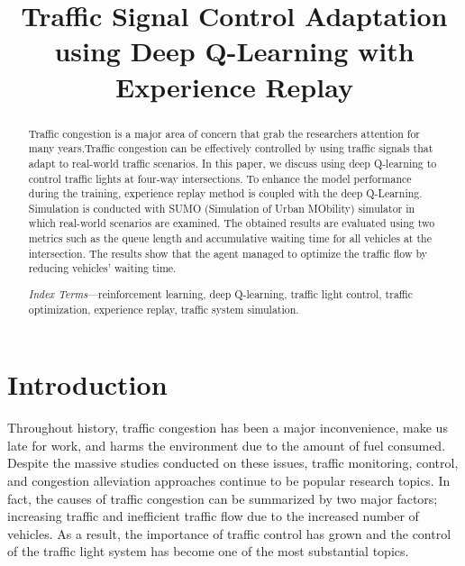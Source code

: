 \documentclass[conference]{IEEEtran}
\begin{document}
\def\refname{\textbf{References}}

\title{Traffic Signal Control Adaptation using Deep Q-Learning with Experience Replay}

\author{
    
 
    \and
    
    
}
\maketitle
\IEEEpeerreviewmaketitle


\begin{abstract}
Traffic congestion is a major area of concern that grab the researchers attention for many years.Traffic congestion can be effectively controlled by using traffic signals that adapt to real-world traffic scenarios. In this paper, we discuss using deep Q-learning to control traffic lights at four-way intersections. To enhance the model performance during the training, experience replay method is coupled with the deep Q-Learning. Simulation is conducted with SUMO (Simulation of Urban MObility) simulator in which real-world scenarios are examined. The obtained results are evaluated using two metrics such as the queue length and accumulative waiting time for all vehicles at the intersection. The results show that the agent managed to optimize the traffic flow by reducing vehicles' waiting time.

\textit{Index Terms}—reinforcement learning, deep Q-learning, traffic light control,
traffic optimization, experience replay, traffic system simulation. 

\end{abstract}

\section{Introduction}
Throughout history, traffic congestion has been a major inconvenience, make us late for work, and harms the environment due to the amount of fuel consumed. Despite the massive studies conducted on these issues, traffic monitoring, control, and congestion alleviation approaches continue to be popular research topics. In fact, the causes of traffic congestion can be summarized by two major factors; increasing traffic and inefficient traffic flow due to the increased number of vehicles. As a result, the importance of traffic control has grown and the control of the traffic light system has become one of the most substantial topics.
\end{document}
